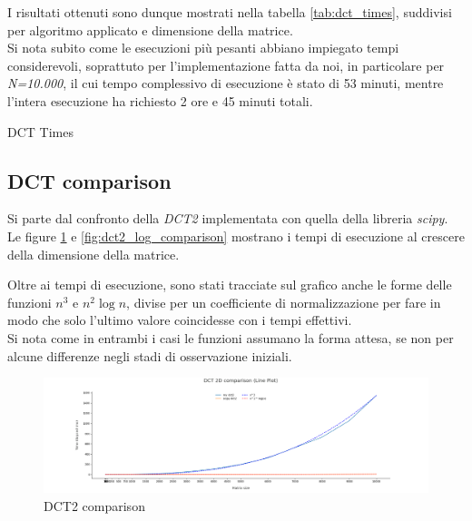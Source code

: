 I risultati ottenuti sono dunque mostrati nella tabella \ref{tab:dct_times}, suddivisi per algoritmo applicato e dimensione della matrice.\\
Si nota subito come le esecuzioni più pesanti abbiano impiegato tempi considerevoli, soprattuto per l'implementazione fatta da noi, in particolare per \textit{N=10.000}, il cui tempo complessivo di esecuzione è stato di 53 minuti, mentre l'intera esecuzione ha richiesto 2 ore e 45 minuti totali.

\begin{table}[H]
    \centering
    
    \caption{DCT Times}
    \label{tab:dct_times}
\end{table}

\subsection{DCT comparison}

Si parte dal confronto della \textit{DCT2} implementata con quella della libreria \textit{scipy}.\\
Le figure \ref{fig:dct2_comparison} e \ref{fig:dct2_log_comparison} mostrano i tempi di esecuzione al crescere della dimensione della matrice.

Oltre ai tempi di esecuzione, sono stati tracciate sul grafico anche le forme delle funzioni $n^{3}$ e $n^{2}\log{}n$, divise per un coefficiente di normalizzazione per fare in modo che solo l'ultimo valore coincidesse con i tempi effettivi.\\
Si nota come in entrambi i casi le funzioni assumano la forma attesa, se non per alcune differenze negli stadi di osservazione iniziali.

\begin{figure}[H]
\hspace*{-2cm} \includegraphics[scale=0.4]{figs/DCT Comparison/dct2_comparison.png}
    \caption{DCT2 comparison}
    \label{fig:dct2_comparison}
\end{figure}

